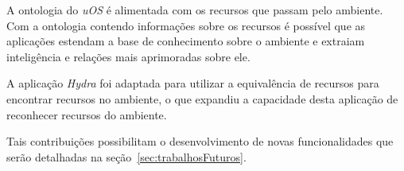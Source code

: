 A ontologia do \emph{uOS} é alimentada com os recursos que passam pelo ambiente. Com a ontologia contendo informações sobre os recursos é possível que as aplicações estendam a base de conhecimento sobre o ambiente e extraiam inteligência e relações mais aprimoradas sobre ele.

A aplicação \emph{Hydra} foi adaptada para utilizar a equivalência de recursos para encontrar recursos no ambiente, o que expandiu a capacidade desta aplicação de reconhecer recursos do ambiente.

Tais contribuições possibilitam o desenvolvimento de novas funcionalidades que serão detalhadas na seção~\ref{sec:trabalhosFuturos}.

